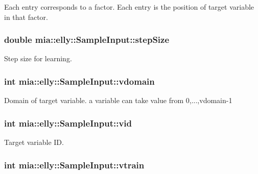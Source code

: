 Each entry corresponds to a factor. Each entry is the position of target variable in that factor. \hypertarget{classmia_1_1elly_1_1_sample_input_ad67a5cd17d47a0b1ad54d919de682cd3}{
\subsubsection[{step\-Size}]{\setlength{\rightskip}{0pt plus 5cm}double mia\-::elly\-::\-Sample\-Input\-::step\-Size}}\label{classmia_1_1elly_1_1_sample_input_ad67a5cd17d47a0b1ad54d919de682cd3}
Step size for learning. \hypertarget{classmia_1_1elly_1_1_sample_input_a8487498906d59dd89e3804c25f728829}{
\subsubsection[{vdomain}]{\setlength{\rightskip}{0pt plus 5cm}int mia\-::elly\-::\-Sample\-Input\-::vdomain}}\label{classmia_1_1elly_1_1_sample_input_a8487498906d59dd89e3804c25f728829}
Domain of target variable. a variable can take value from 0,...,vdomain-\/1 \hypertarget{classmia_1_1elly_1_1_sample_input_a9e9d587d3e2f5b0881121841c217baba}{
\subsubsection[{vid}]{\setlength{\rightskip}{0pt plus 5cm}int mia\-::elly\-::\-Sample\-Input\-::vid}}\label{classmia_1_1elly_1_1_sample_input_a9e9d587d3e2f5b0881121841c217baba}
Target variable I\-D. \hypertarget{classmia_1_1elly_1_1_sample_input_a1c929af5f0d6534c55217c43298f20fc}{
\subsubsection[{vtrain}]{\setlength{\rightskip}{0pt plus 5cm}int mia\-::elly\-::\-Sample\-Input\-::vtrain}}\label{classmia_1_1elly_1_1_sample_input_a1c929af5f0d6534c55217c43298f20fc}
